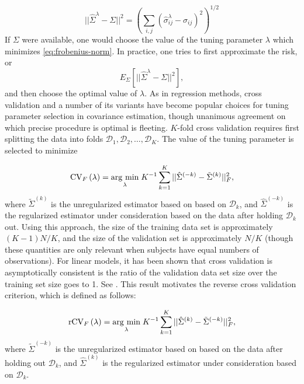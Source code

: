 \begin{equation} \label{eq:forbenius-norm}
\vert \vert  \hat{\Sigma}^\lambda - \Sigma \vert \vert^2 = \left(\sum_{i,j} \left(\hat{\sigma}^\lambda_{ij} - \sigma_{ij} \right)^2\right)^{1/2}
\end{equation}
\noindent
If $\Sigma$ were available, one would choose the value of the tuning parameter $\lambda$ which minimizes \ref{eq:frobenius-norm}. In practice, one tries to first approximate the risk, or 
\[
E_\Sigma\left[\vert \vert  \hat{\Sigma}^\lambda - \Sigma \vert \vert^2 \right],
\]
\noindent
and then choose the optimal value of $\lambda$.  As in regression methods, cross validation and a number of its variants have become popular choices for tuning parameter selection in covariance estimation, though unanimous agreement on which precise procedure is optimal is fleeting.  $K$-fold cross validation requires first splitting the data into folds $\mathcal{D}_1, \mathcal{D}_2, \dots, \mathcal{D}_K$. The value of the tuning parameter is selected to minimize

\begin{equation} \label{eq:K-fold-matrix--cv}
\mbox{CV}_F\left(\lambda \right) = \underset{\lambda}{\operatorname{arg}\,\operatorname{min}}\; K^{-1} \sum_{k = 1}^K  \vert \vert\hat{\Sigma}^{\left(-k\right)} - \tilde{\Sigma}^{\left(k\right)}  \vert \vert_F^2, 
\end{equation}
\noindent
where $\tilde{\Sigma}^{\left(k\right)}$ is the unregularized estimator based on based on $\mathcal{D}_k$, and $\hat{\Sigma}^{\left(-k\right)}$ is the regularized estimator under consideration based on the data after holding $\mathcal{D}_k$ out.  Using this approach, the size of the training data set is approximately $\left(K - 1 \right)N/K$, and the size of the validation set is approximately $N/K$ (though these quantities are only relevant when subjects have equal numbers of observations). For linear models, it has been shown that cross validation is asymptotically consistent is the ratio of the validation data set size over the training set size goes to 1. See \cite{shao1993linear}. This result motivates the reverse cross validation criterion, which is defined as follows:

\begin{equation} \label{eq:K-fold-matrix-reverse-cv}
\mbox{rCV}_F\left(\lambda \right) = \underset{\lambda}{\operatorname{arg}\,\operatorname{min}}\; K^{-1} \sum_{k = 1}^K  \vert \vert\hat{\Sigma}^{\left(k\right)} - \tilde{\Sigma}^{\left(-k\right)}  \vert \vert_F^2, 
\end{equation}
\noindent
where $\tilde{\Sigma}^{\left(-k\right)}$ is the unregularized estimator based on based on the data after holding out $\mathcal{D}_k$, and $\hat{\Sigma}^{\left(k\right)}$ is the regularized estimator under consideration based on $\mathcal{D}_k$. 


